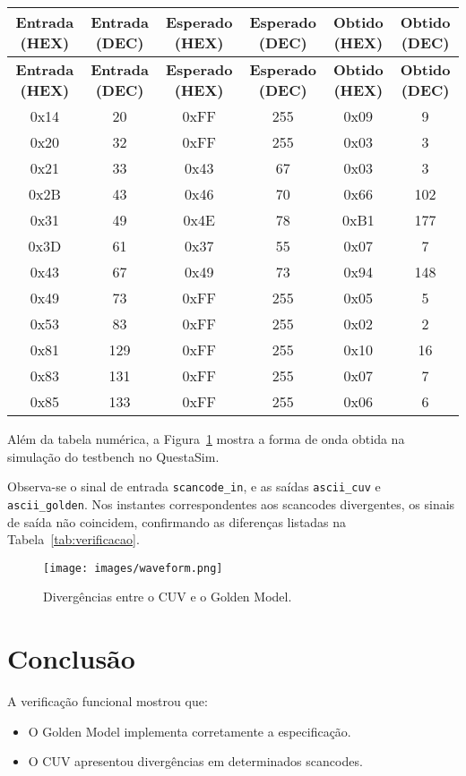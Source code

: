\documentclass[12pt,a4paper]{article}
\begin{document}
{\scriptsize
\begin{longtable}{|c|c|c|c|c|c|}
\hline
\textbf{Entrada (HEX)} & \textbf{Entrada (DEC)} & 
\textbf{Esperado (HEX)} & \textbf{Esperado (DEC)} & 
\textbf{Obtido (HEX)} & \textbf{Obtido (DEC)} \\
\hline
\endfirsthead
\hline
\textbf{Entrada (HEX)} & \textbf{Entrada (DEC)} & 
\textbf{Esperado (HEX)} & \textbf{Esperado (DEC)} & 
\textbf{Obtido (HEX)} & \textbf{Obtido (DEC)} \\
\hline
\endhead
0x14 & 20  & 0xFF & 255 & 0x09 & 9   \\ \hline
0x20 & 32  & 0xFF & 255 & 0x03 & 3   \\ \hline
0x21 & 33  & 0x43 & 67  & 0x03 & 3   \\ \hline
0x2B & 43  & 0x46 & 70  & 0x66 & 102 \\ \hline
0x31 & 49  & 0x4E & 78  & 0xB1 & 177 \\ \hline
0x3D & 61  & 0x37 & 55  & 0x07 & 7   \\ \hline
0x43 & 67  & 0x49 & 73  & 0x94 & 148 \\ \hline
0x49 & 73  & 0xFF & 255 & 0x05 & 5   \\ \hline
0x53 & 83  & 0xFF & 255 & 0x02 & 2   \\ \hline
0x81 & 129 & 0xFF & 255 & 0x10 & 16  \\ \hline
0x83 & 131 & 0xFF & 255 & 0x07 & 7   \\ \hline
0x85 & 133 & 0xFF & 255 & 0x06 & 6   \\ \hline
\end{longtable}
}

\label{tab:verificacao}

Além da tabela numérica, a Figura~\ref{fig:ondas} mostra a forma de onda obtida 
na simulação do testbench no QuestaSim. 

Observa-se o sinal de entrada \texttt{scancode\_in}, e as saídas 
\texttt{ascii\_cuv} e \texttt{ascii\_golden}. 
Nos instantes correspondentes aos scancodes divergentes, os sinais de saída não coincidem, 
confirmando as diferenças listadas na Tabela~\ref{tab:verificacao}.

\begin{figure}[h!]
    \centering
\texttt{[image: images/waveform.png]}
    \caption{Divergências entre o CUV e o Golden Model.}
    \label{fig:ondas}
\end{figure}

\section{Conclusão}
A verificação funcional mostrou que:
\begin{itemize}
    \item O Golden Model implementa corretamente a especificação.
    \item O CUV apresentou divergências em determinados scancodes.

\end{itemize}
\end{document}
